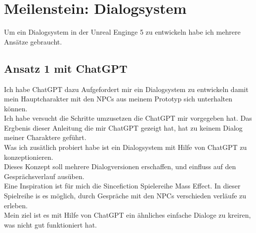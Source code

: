 {%
\section {Meilenstein: Dialogsystem}
Um ein Dialogsystem in der Unreal Enginge 5 zu entwickeln habe ich mehrere Ansätze gebraucht.
 
\subsection{Ansatz 1 mit ChatGPT}
Ich habe ChatGPT dazu Aufgefordert mir ein Dialogsystem zu entwickeln damit mein Hauptcharakter mit den NPCs aus meinem Prototyp sich unterhalten können.
\\
Ich habe versucht die Schritte umzusetzen die ChatGPT mir vorgegeben hat. Das Ergbenis dieser Anleitung die mir ChatGPT gezeigt hat, hat zu keinem Dialog meiner Charaktere geführt.
\\
Was ich zusätlich probiert habe ist ein Dialogsystem mit Hilfe von ChatGPT zu konzeptionieren.
\\
Dieses Konzept soll mehrere Dialogversionen erschaffen, und einfluss auf den Gesprächsverlauf ausüben.
\\
Eine Inspiration ist für mich die Sincefiction Spielereihe Mass Effect. In dieser Spielreihe is es möglich, durch Gespräche mit den NPCs verschieden verläufe zu erleben.
\\
Mein ziel ist es mit Hilfe von ChatGPT ein ähnliches einfache Dialoge zu kreiren, was nicht gut funktioniert hat.
\\
}
